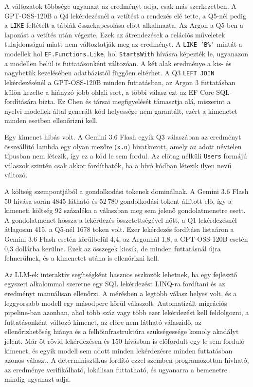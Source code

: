 A változatok többsége ugyanazt az eredményt adja, csak más szerkezetben. A GPT-OSS-120B a Q4 lekérdezésnél a vetítést a rendezés elé tette, a Q5-nél pedig a \texttt{LIKE} feltételt a táblák összekapcsolása előtt alkalmazta. Az Argon a Q5-ben a lapozást a vetítés után végezte. Ezek az átrendezések a relációs műveletek tulajdonságai miatt nem változtatják meg az eredményt. A \texttt{LIKE 'B\%'} mintát a modellek hol \texttt{EF.Functions.Like}, hol \texttt{StartsWith} hívásra képezték le, ugyanazon a modellen belül is futtatásonként változóan. A két alak eredménye a kis- és nagybetűk kezelésében adatbázistól függően eltérhet. A Q3 \texttt{LEFT JOIN} lekérdezésénél a GPT-OSS-120B minden futtatásban, az Argon 3 futtatásban külön kezelte a hiányzó jobb oldali sort, a többi válasz ezt az EF Core SQL-fordítására bízta. Ez Chen és társai \cite{chen2021codex} megfigyelését támasztja alá, miszerint a nyelvi modellek által generált kód helyessége nem garantált, ezért a kimenetet minden esetben ellenőrizni kell.

Egy kimenet hibás volt. A Gemini 3.6 Flash egyik Q3 válaszában az eredményt összeállító lambda egy olyan mezőre (\texttt{x.o}) hivatkozott, amely az adott névtelen típusban nem létezik, így ez a kód le sem fordul. Az előtag nélküli \texttt{Users} formájú válaszok szintén csak akkor fordíthatók, ha a hívó kódban létezik ilyen nevű változó.

A költség szempontjából a gondolkodási tokenek dominálnak. A Gemini 3.6 Flash 50 hívása során 4845 látható és 52\,780 gondolkodási tokent állított elő, így a kimeneti költség 92 százaléka a válaszban meg sem jelenő gondolatmenetre esett. A gondolatmenet hossza a lekérdezés összetettségével nőtt, a Q1 lekérdezésnél átlagosan 415, a Q5-nél 1678 token volt. Ezer lekérdezés fordítása listaáron a Gemini 3.6 Flash esetén körülbelül 4,4, az Argonnál 1,8, a GPT-OSS-120B esetén 0,3 dollárba kerülne. Ezek az összegek kicsik, de minden futtatásnál újra felmerülnek, és a kimenetet utána is ellenőrizni kell.


Az LLM-ek interaktív segítségként hasznos eszközök lehetnek, ha egy fejlesztő egyszeri alkalommal szeretne egy SQL lekérdezést LINQ-ra fordítani és az eredményt manuálisan ellenőrzi. A mérésben a legtöbb válasz helyes volt, és a leggyorsabb modell egy másodperc körül válaszolt. Automatizált migrációs pipeline-ban azonban, ahol több száz vagy több ezer lekérdezést kell feldolgozni, a futtatásonként változó kimenet, az előre nem látható válaszidő, az ellenőrizhetőség hiánya és a felhőinfrastruktúra szükségessége komoly akadályt jelent. Már öt rövid lekérdezésen és 150 hívásban is előfordult egy le sem forduló kimenet, és egyik modell sem adott minden lekérdezésre minden futtatásban azonos választ. A determinisztikus fordító ezzel szemben programozottan hívható, az eredménye verifikálható, lokálisan futtatható, és ugyanarra a bemenetre mindig ugyanazt adja.

